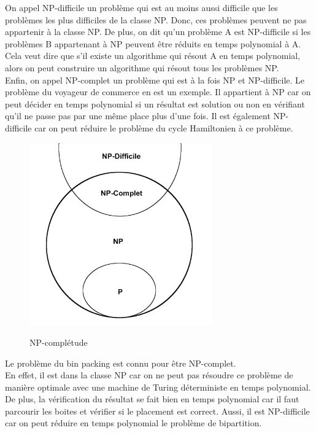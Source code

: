\documentclass[14pt]{extarticle}
\begin{document}
    \noindent
    On appel NP-difficile un problème qui est au moins aussi difficile que les problèmes les plus difficiles de la classe NP. Donc, ces problèmes peuvent ne pas appartenir à la classe NP. De plus, on dit qu'un problème A est NP-difficile si les problèmes B appartenant à NP peuvent être réduits en temps polynomial à A. Cela veut dire que s'il existe un algorithme qui résout A en temps polynomial, alors on peut construire un algorithme qui résout tous les problèmes NP.\\
    Enfin, on appel NP-complet un problème qui est à la fois NP et NP-difficile. Le problème du voyageur de commerce en est un exemple. Il appartient à NP car on peut décider en temps polynomial si un résultat est solution ou non en vérifiant qu'il ne passe pas par une même place plus d'une fois. Il est également NP-difficile car on peut réduire le problème du cycle Hamiltonien à ce problème.\\
    \newpage
    \begin{figure}[!h]
        \centering
        \includegraphics[width=0.7\textwidth]{img/np-complet.png}
        \label{NP-complétude}
        \caption{NP-complétude}
    \end{figure}
    \noindent
    Le problème du bin packing est connu pour être NP-complet.\\
    En effet, il est dans la classe NP car on ne peut pas résoudre ce problème de manière optimale avec une machine de Turing déterministe en temps polynomial. De plus, la vérification du résultat se fait bien en temps polynomial car il faut parcourir les boites et vérifier si le placement est correct.
    Aussi, il est NP-difficile car on peut réduire en temps polynomial le problème de bipartition.\\
\end{document}
